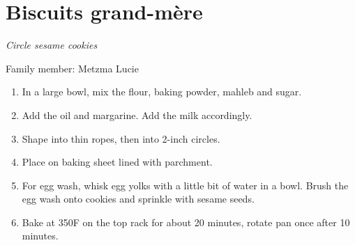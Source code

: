 \chapter{Biscuits grand-mère}
\label{ch:biscuits_grandmere}
\textit{Circle sesame cookies}

Family member: Metzma Lucie



\begin{enumerate}
    \item In a large bowl, mix the flour, baking powder, mahleb and sugar.
    \item Add the oil and margarine. Add the milk accordingly.
    \item Shape into thin ropes, then into 2-inch circles.
    \item Place on baking sheet lined with parchment.
    \item For egg wash, whisk egg yolks with a little bit of water in a bowl. Brush the egg wash onto cookies and sprinkle with sesame seeds.
    \item Bake at 350\degree F on the top rack for about 20 minutes, rotate pan once after 10 minutes.
\end{enumerate}